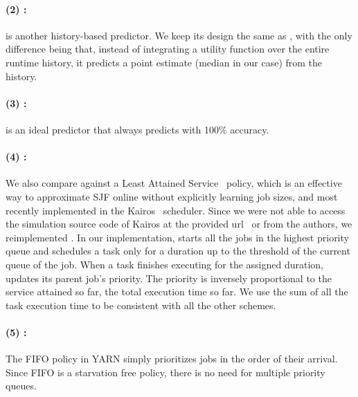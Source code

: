 \paragraph{(2) \pointestimator: }
\pointestimator is another history-based predictor. We keep its design the same
as \primarybasepredict, with the only difference being that, instead of integrating a
utility function over the entire runtime history, it predicts a
point estimate (median in our case) from the history.


\paragraph{(3) \oracle: }
\oracle is an ideal predictor that always predicts with 100\% accuracy.

{
\paragraph{(4) \las: }
We also compare \slearn against a Least Attained Service~\cite{raiLAS:sigmetrics2003} policy,
which is an effective way to approximate SJF online without explicitly learning job sizes,
and most recently implemented in the Kairos~\cite{kairos:socc2018} scheduler.
Since we were not able to access the simulation source code of Kairos at the
provided url~\cite{kairosScheduler} or from the authors,
we reimplemented \las.
%
In our implementation, \las starts all the jobs in the highest priority queue
and schedules a task only for a duration up to the threshold of the current queue
of the job. When a task finishes executing for the assigned duration, \las
updates its parent job's priority. The priority is inversely proportional to
the service attained so far, \ie the total execution time so far. We use the
sum of all the task execution time to be consistent with all the other schemes.
}

\paragraph{(5) \fifo: } 
{The FIFO policy in YARN simply prioritizes jobs in the order of their arrival.}
Since FIFO is a starvation free policy, there is no need for
multiple priority queues.
